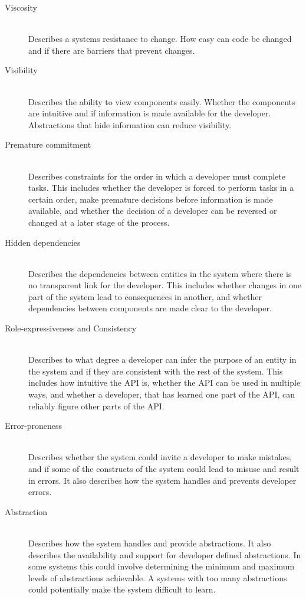 \begin{description}
    \item[Viscosity]\hfill\\
    Describes a systems resistance to change. How easy can code be changed and if there are barriers that prevent changes.
    \item[Visibility]\hfill\\
    Describes the ability to view components easily. Whether the components are intuitive and if information is made available for the developer. Abstractions that hide information can reduce visibility.
    \item[Premature commitment]\hfill\\
    Describes constraints for the order in which a developer must complete tasks. This includes whether the developer is forced to perform tasks in a certain order, make premature decisions before information is made available, and whether the decision of a developer can be reversed or changed at a later stage of the process.
    \item[Hidden dependencies]\hfill\\ %
    Describes the dependencies between entities in the system where there is no transparent link for the developer. This includes whether changes in one part of the system lead to consequences in another, and whether dependencies between components are made clear to the developer.
    \item[Role-expressiveness and Consistency]\hfill\\
    Describes to what degree a developer can infer the purpose of an entity in the system and if they are consistent with the rest of the system. This includes how intuitive the API is, whether the API can be used in multiple ways, and whether a developer, that has learned one part of the API, can reliably figure other parts of the API. 
    \item[Error-proneness]\hfill\\
    Describes whether the system could invite a developer to make mistakes, and if some of the constructs of the system could lead to misuse and result in errors. It also describes how the system handles and prevents developer errors.
    \item[Abstraction]\hfill\\
    Describes how the system handles and provide abstractions. It also describes the availability and support for developer defined abstractions. In some systems this could involve determining the minimum and maximum levels of abstractions achievable. A systems with too many abstractions could potentially make the system difficult to learn.

\end{description}
